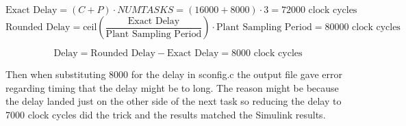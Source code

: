 \begin{equation}
	\text{Exact Delay}=(C+P)\cdot NUMTASKS  = (16000+8000)\cdot 3  = 72000 \text{ clock cycles}
	\label{eq:delay}
\end{equation}
\begin{equation}
	\text{Rounded Delay}= \text{ceil}\left(\dfrac{\text{Exact Delay}}{\text{Plant Sampling Period}}\right) \cdot \text{Plant Sampling Period} = 80000 \text{ clock cycles}
\label{eq:rounddelay}
\end{equation}

\begin{equation}
\text{Delay}=\text{Rounded Delay} - \text{Exact Delay}= 8000 \text{ clock cycles}
\label{eq:delayall}
\end{equation}

Then when substituting 8000 for the delay in sconfig.c the output file gave error regarding timing that the delay might be to long. The reason might be because the delay landed just on the other side of the next task so reducing the delay to 7000 clock cycles did the trick and the results matched the Simulink results.




